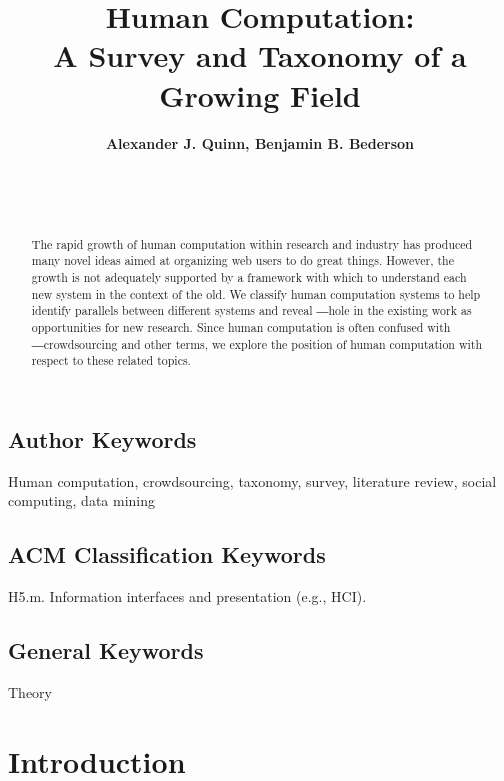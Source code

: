 \documentclass{sig-alternate}
\begin{document}
\title{Human Computation:\\
A Survey and Taxonomy of a Growing Field}

\author{
  \textbf{Alexander J. Quinn, Benjamin B. Bederson}\\
 \\
 \\
 \\
}
\maketitle	

\begin{abstract}
The rapid growth of human computation within research and industry has produced many novel ideas aimed at organizing web users to do great things. However, the growth is not adequately supported by a framework with which to understand each new system in the context of the old. We classify human computation systems to help identify parallels between different systems and reveal ―hole in the existing work as opportunities for new research. Since human computation is often confused with ―crowdsourcing and other terms, we explore the position of human computation with respect to these related topics.
\end{abstract}

\subsection*{Author Keywords}
Human computation, crowdsourcing, taxonomy, survey, literature review, social computing, data mining
\subsection*{ACM Classification Keywords}
H5.m. Information interfaces and presentation (e.g., HCI).
\subsection*{General Keywords}
Theory

\section{Introduction}
\end{document}
